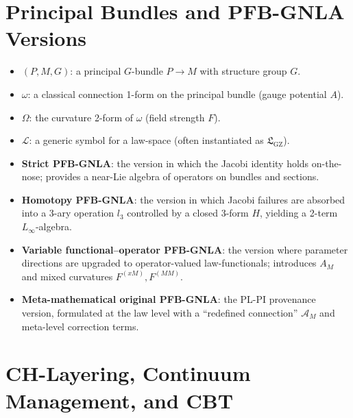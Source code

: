 \documentclass[11pt]{book}
\theoremstyle{plain}
\theoremstyle{definition}
\newcommand{\GZLS}{\ensuremath{\mathfrak{L}_{\mathrm{GZ}}}}       \newcommand{\GZLT}{\ensuremath{M_{!w}}}                           \newcommand{\GZLOC}{\ensuremath{A_M}}                             \newcommand{\GZLCurv}{\ensuremath{\mathcal{F}_{\mathrm{law}}}}
\newcommand{\LawSpace}{\ensuremath{\mathcal{L}}}                  \newcommand{\Base}{\ensuremath{M}}                                \newcommand{\Bundle}{\ensuremath{P}}                              \newcommand{\pr}{\operatorname{pr}}                               \newcommand{\Group}{\ensuremath{G}}                               \newcommand{\Conn}{\ensuremath{\omega}}                           \newcommand{\Curv}{\ensuremath{\Omega}}                           \newcommand{\Homotopy}{\ensuremath{\mathcal{H}}}                  \newcommand{\Jac}{\ensuremath{\mathsf{Jac}}}                      \newcommand{\Layer}{\ensuremath{\ell}}
\begin{document}
\section{Principal Bundles and PFB-GNLA Versions}


\begin{itemize}
  \item $(\Bundle,\Base,\Group)$:
        a principal $\Group$-bundle $\Bundle\to\Base$ with structure
        group $\Group$.
\item $\Conn$:
        a classical connection 1-form on the principal bundle
        (gauge potential $A$).
\item $\Curv$:
        the curvature 2-form of $\Conn$ (field strength $F$).
\item $\LawSpace$:
        a generic symbol for a law-space (often instantiated as
        $\GZLS$).
\item \textbf{Strict PFB-GNLA}:
        the version in which the Jacobi identity holds on-the-nose;
        provides a near-Lie algebra of operators on bundles and
        sections.
\item \textbf{Homotopy PFB-GNLA}:
        the version in which Jacobi failures are absorbed into a
        3-ary operation $l_3$ controlled by a closed 3-form $H$,
        yielding a 2-term $L_\infty$-algebra.
\item \textbf{Variable functional--operator PFB-GNLA}:
        the version where parameter directions are upgraded to
        operator-valued law-functionals; introduces $A_M$ and mixed
        curvatures $F^{(xM)},F^{(MM)}$.
\item \textbf{Meta-mathematical original PFB-GNLA}:
        the PL-PI provenance version, formulated at the law level
        with a “redefined connection” $\mathcal A_M$ and meta-level
        correction terms.
\end{itemize}

\section{CH-Layering, Continuum Management, and CBT}
\end{document}
